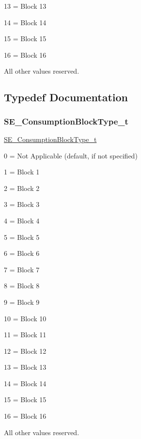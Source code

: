 13 = Block 13

14 = Block 14

15 = Block 15

16 = Block 16

All other values reserved. 

\subsection{Typedef Documentation}
\mbox{\label{group__ConsumptionBlockType_ga526f797922e4c3009d50c28f457c462e}} 
\subsubsection{\texorpdfstring{S\+E\+\_\+\+Consumption\+Block\+Type\+\_\+t}{SE\_ConsumptionBlockType\_t}}
{\footnotesize\ttfamily \hyperlink{group__ConsumptionBlockType_ga526f797922e4c3009d50c28f457c462e}{S\+E\+\_\+\+Consumption\+Block\+Type\+\_\+t}}

0 = Not Applicable (default, if not specified)

1 = Block 1

2 = Block 2

3 = Block 3

4 = Block 4

5 = Block 5

6 = Block 6

7 = Block 7

8 = Block 8

9 = Block 9

10 = Block 10

11 = Block 11

12 = Block 12

13 = Block 13

14 = Block 14

15 = Block 15

16 = Block 16

All other values reserved. 